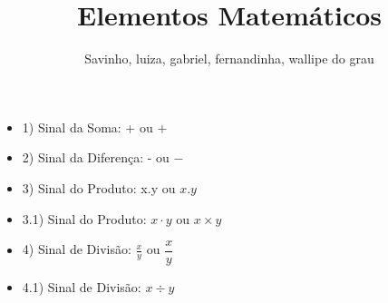 \documentclass[a4paper,12pt]{article}
\begin{document}
\title{Elementos Matemáticos}
\author{Savinho, luiza, gabriel, fernandinha, wallipe do grau}
\maketitle

\begin{itemize}
    \item[ ] 1) Sinal da Soma: + ou $+$
    \item[ ] 2) Sinal da Diferença: - ou $-$
    \item[ ] 3) Sinal do Produto: x.y ou $x.y$
    \item[ ] 3.1) Sinal do Produto: $x \cdot y$ ou $x \times y$
    \item[ ] 4) Sinal de Divisão: $\frac{x}{y}$ ou $\dfrac{x}{y}$
    \item[ ] 4.1) Sinal de Divisão: $x \div y$
\end{itemize}
\end{document}
